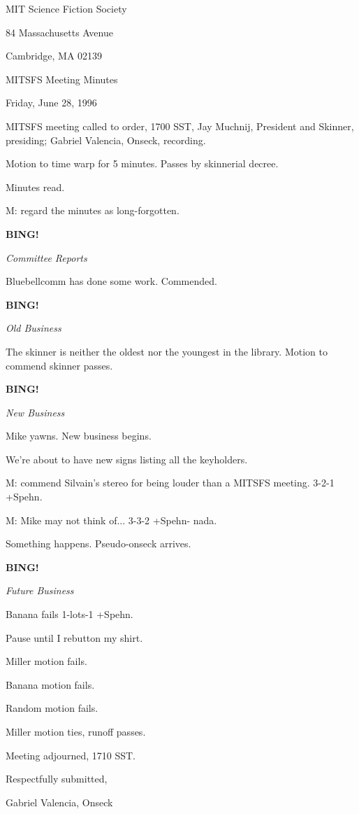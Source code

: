 \documentclass[12pt]{article}
\newcommand{\bing}{{\bf BING!} }
\newcommand{\goto}[1]{\bing \vskip 12pt \centerline{{\em{#1}}}}
\begin{document}
\begin{center}

MIT Science Fiction Society 

84 Massachusetts Avenue

Cambridge, MA 02139

\vspace{12pt}

MITSFS Meeting Minutes 

Friday, June 28, 1996

\end{center}
 
\vspace{18pt}

\setlength{\parskip}{6pt}

\noindent
MITSFS meeting called to order, 1700 SST,
Jay Muchnij, President and Skinner, presiding; Gabriel Valencia, Onseck, recording.

Motion to time warp for 5 minutes. Passes by skinnerial decree.

Minutes read.

M: regard the minutes as long-forgotten.

\goto{Committee Reports}

Bluebellcomm has done some work. Commended.

\goto{Old Business}

The skinner is neither the oldest nor the youngest in the library. Motion to commend skinner passes.

\goto{New Business}

Mike yawns. New business begins.

We're about to have new signs listing all the keyholders.

M: commend Silvain's stereo for being louder than a MITSFS meeting. 3-2-1 +Spehn.

M: Mike may not think of... 3-3-2 +Spehn- nada.

Something happens. Pseudo-onseck arrives.

\goto{Future Business}

Banana fails 1-lots-1 +Spehn.

Pause until I rebutton my shirt.

Miller motion fails.

Banana motion fails.

Random motion fails.

Miller motion ties, runoff passes.

\vspace{12pt}

\noindent
Meeting adjourned, 1710 SST.

\vspace{18pt}

\centerline{Respectfully submitted,}
\centerline{Gabriel Valencia, Onseck}
\end{document}
